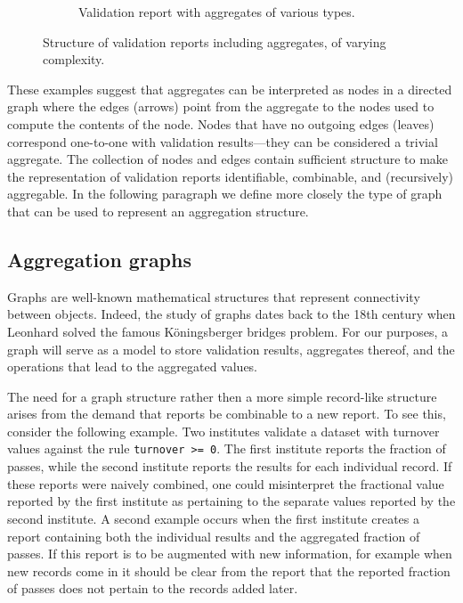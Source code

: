 \documentclass[a4paper, 11pt,titlepage]{article}
\newcommand{\code}[1]{\texttt{#1}}
\begin{document}
\begin{figure}[!t]
\begin{subfigure}[b]{0.7\textwidth}
    \caption{Validation report with aggregates of various types.}
    \label{fig:graph3}
  \end{subfigure}
  \caption{Structure of validation reports including aggregates, of varying complexity.}
  \label{fig:graphs}
\end{figure}

These examples suggest that aggregates can be interpreted as nodes in a
directed graph where the edges (arrows) point from the aggregate to the nodes
used to compute the contents of the node. Nodes that have no outgoing edges
(leaves) correspond one-to-one with validation results---they can be considered
a trivial aggregate. The collection of nodes and edges contain sufficient
structure to make the representation of validation reports identifiable,
combinable, and (recursively) aggregable. In the following paragraph we define
more closely the type of graph that can be used to represent an aggregation
structure.


\subsection{Aggregation graphs}
\label{sect:aggregationgraphs}
Graphs are well-known mathematical structures that represent connectivity
between objects. Indeed, the  study of graphs dates back to the 18th century
when Leonhard \citet{euler1741solutio} solved the famous K\"oningsberger
bridges problem.  For our purposes, a graph will serve as a model to store
validation results, aggregates thereof, and the operations that lead to the
aggregated values.

The need for a graph structure rather then a more simple record-like structure
arises from the demand that reports be combinable to a new report.  To see
this, consider the following example. Two institutes validate a dataset with
turnover values against the rule \code{turnover >= 0}. The first institute
reports the fraction of passes, while the second institute reports the results
for each individual record. If these reports were naively combined, one could
misinterpret the fractional value reported by the first institute as pertaining
to the separate values reported by the second institute. A second example
occurs when the first institute creates a report containing both the individual
results and the aggregated fraction of passes. If this report is to be
augmented with new information, for example when new records come in it should
be clear from the report that the reported fraction of passes does not pertain
to the records added later.
\end{document}
